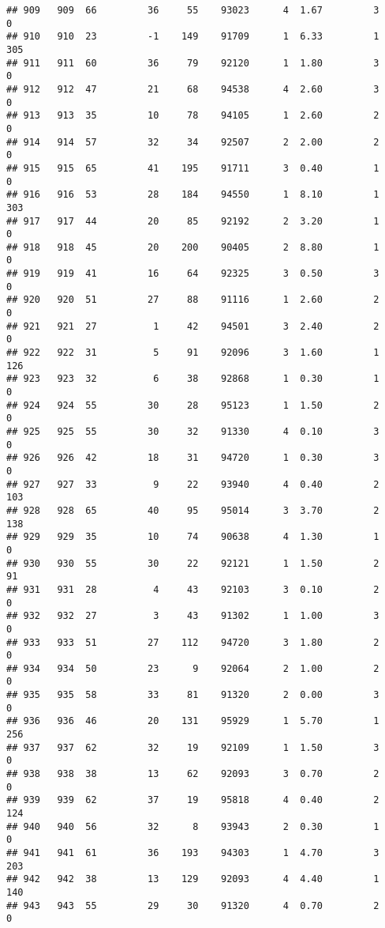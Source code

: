 \documentclass[
]{article}
\begin{document}
\begin{verbatim}
## 909   909  66         36     55    93023      4  1.67         3        0
## 910   910  23         -1    149    91709      1  6.33         1      305
## 911   911  60         36     79    92120      1  1.80         3        0
## 912   912  47         21     68    94538      4  2.60         3        0
## 913   913  35         10     78    94105      1  2.60         2        0
## 914   914  57         32     34    92507      2  2.00         2        0
## 915   915  65         41    195    91711      3  0.40         1        0
## 916   916  53         28    184    94550      1  8.10         1      303
## 917   917  44         20     85    92192      2  3.20         1        0
## 918   918  45         20    200    90405      2  8.80         1        0
## 919   919  41         16     64    92325      3  0.50         3        0
## 920   920  51         27     88    91116      1  2.60         2        0
## 921   921  27          1     42    94501      3  2.40         2        0
## 922   922  31          5     91    92096      3  1.60         1      126
## 923   923  32          6     38    92868      1  0.30         1        0
## 924   924  55         30     28    95123      1  1.50         2        0
## 925   925  55         30     32    91330      4  0.10         3        0
## 926   926  42         18     31    94720      1  0.30         3        0
## 927   927  33          9     22    93940      4  0.40         2      103
## 928   928  65         40     95    95014      3  3.70         2      138
## 929   929  35         10     74    90638      4  1.30         1        0
## 930   930  55         30     22    92121      1  1.50         2       91
## 931   931  28          4     43    92103      3  0.10         2        0
## 932   932  27          3     43    91302      1  1.00         3        0
## 933   933  51         27    112    94720      3  1.80         2        0
## 934   934  50         23      9    92064      2  1.00         2        0
## 935   935  58         33     81    91320      2  0.00         3        0
## 936   936  46         20    131    95929      1  5.70         1      256
## 937   937  62         32     19    92109      1  1.50         3        0
## 938   938  38         13     62    92093      3  0.70         2        0
## 939   939  62         37     19    95818      4  0.40         2      124
## 940   940  56         32      8    93943      2  0.30         1        0
## 941   941  61         36    193    94303      1  4.70         3      203
## 942   942  38         13    129    92093      4  4.40         1      140
## 943   943  55         29     30    91320      4  0.70         2        0

\end{verbatim}
\end{document}

